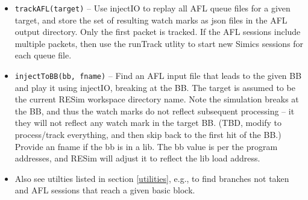 \documentclass[titlepage]{article}
\begin{document}
\begin{itemize}
\item{\tt trackAFL(target)} -- Use injectIO to replay all AFL queue files for a given target, and store the set of resulting watch marks as json files
in the AFL output directory.  Only the first packet is tracked.  If the AFL sessions include multiple packets, then use the runTrack utlity to 
start new Simics sessions for each queue file.

\item{\tt injectToBB(bb, fname)} -- Find an AFL input file that leads to the given BB and play it using injectIO, breaking at the BB.  The target
is assumed to be the current RESim workspace directory name.  Note the simulation breaks at the BB, and thus the watch marks do not reflect subsequent
processing -- it they will not reflect any watch mark in the target BB. (TBD, modify to process/track everything, and then skip back to the first hit of the BB.)
Provide an fname if the bb is in a lib.  The bb value is per the program addresses, and RESim will adjust it to reflect the lib load address.

\item Also see utilties listed in section \ref{utilities}, e.g., to find branches not taken and AFL sessions that reach a given basic block.

\end{itemize}
\end{document}
